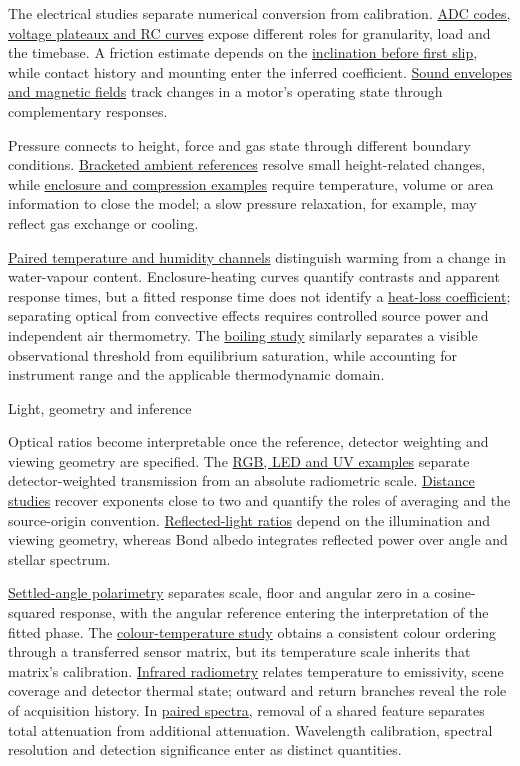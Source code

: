 \documentclass[11pt,letterpaper]{article}
\newcommand{\paperlink}[2]{\href{cs-paper:#1}{#2}}
\newcommand{\overviewheading}[1]{%
  \par\vspace{0.65em}{\large\bfseries #1\par}\vspace{0.12em}}
\newcommand{\fronttitle}[1]{%
  {\fontsize{28}{33}\selectfont #1\par}\vspace{0.55em}}
\begin{document}
The electrical studies separate numerical conversion from calibration.
\paperlink{analog-inputs}{ADC codes, voltage plateaux and RC curves} expose
different roles for granularity, load and the timebase. A friction estimate
depends on the \paperlink{static-friction}{inclination before first slip}, while
contact history and mounting enter the inferred coefficient.
\paperlink{audio-magnetic}{Sound envelopes and magnetic fields} track changes
in a motor's operating state through complementary responses.

\overviewheading{Pressure, humidity and thermal response}
Pressure connects to height, force and gas state through different boundary
conditions. \paperlink{pressure}{Bracketed ambient references} resolve small
height-related changes, while \paperlink{mission-to-mars}{enclosure and
compression examples} require temperature, volume or area information to close
the model; a slow pressure relaxation, for example, may reflect gas exchange or
cooling.

\paperlink{temperature-humidity}{Paired temperature and humidity channels}
distinguish warming from a change in water-vapour content. Enclosure-heating
curves quantify contrasts and apparent response times, but a fitted response time
does not identify a \paperlink{greenhouse}{heat-loss coefficient}; separating
optical from convective effects requires controlled source power and independent
air thermometry. The \paperlink{pressure-boiling}{boiling study} similarly
separates a visible observational threshold from equilibrium saturation, while
accounting for instrument range and the applicable thermodynamic domain.

\newpage
\fronttitle{Light, geometry and inference}

\overviewheading{Optics and radiometry}
Optical ratios become interpretable once the reference, detector weighting and
viewing geometry are specified. The \paperlink{light-rgb}{RGB, LED and UV
examples} separate detector-weighted transmission from an absolute radiometric
scale. \paperlink{illuminance-distance}{Distance studies} recover exponents close
to two and quantify the roles of averaging and the source-origin convention.
\paperlink{albedo}{Reflected-light ratios} depend on the illumination and viewing
geometry, whereas Bond albedo integrates reflected power over angle and stellar
spectrum.

\paperlink{malus-law}{Settled-angle polarimetry} separates scale, floor and
angular zero in a cosine-squared response, with the angular reference entering
the interpretation of the fitted phase. The
\paperlink{colour-temperature}{colour-temperature study} obtains a consistent
colour ordering through a transferred sensor matrix, but its temperature scale
inherits that matrix's calibration. \paperlink{ir-distance}{Infrared radiometry}
relates temperature to emissivity, scene coverage and detector thermal state;
outward and return branches reveal the role of acquisition history. In
\paperlink{spectral-fingerprints}{paired spectra}, removal of a shared feature
separates total attenuation from additional attenuation. Wavelength calibration,
spectral resolution and detection significance enter as distinct quantities.
\end{document}

